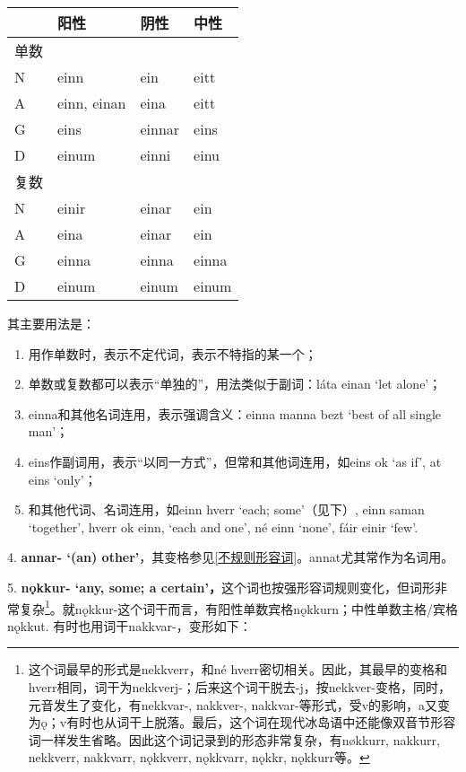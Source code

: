 \begin{longtable}{llll}
  \toprule
     & 阳性          & 阴性     & 中性    \\
  \midrule
  \endhead
  \bottomrule
  \endfoot
  单数 &             &        &       \\
  N  & einn        & ein    & eitt  \\
  A  & einn, einan & eina   & eitt  \\
  G  & eins        & einnar & eins  \\
  D  & einum       & einni  & einu  \\
  复数 &             &        &       \\
  N  & einir       & einar  & ein   \\
  A  & eina        & einar  & ein   \\
  G  & einna       & einna  & einna \\
  D  & einum       & einum  & einum \\
\end{longtable}

其主要用法是：

\begin{enumerate}
  \def\labelenumi{\Alph{enumi}.}
  \item
        用作单数时，表示不定代词，表示不特指的某一个；
  \item
        单数或复数都可以表示``单独的''，用法类似于副词：láta einan `let
        alone'；
  \item
        einna和其他名词连用，表示强调含义：einna manna bezt `best of all
        single man'；
  \item
        eins作副词用，表示``以同一方式''，但常和其他词连用，如eins ok `as if',
        at eins `only'；
  \item
        和其他代词、名词连用，如einn hverr `each; some‌'（见下）, einn saman
        `together', hverr ok einn, `each and one', né einn `none', fáir einir
        `few'.
\end{enumerate}

4. \textbf{annar- `(an)
  other‌'}，其变格参见\ref{不规则形容词}。annat尤其常作为名词用。

5. \textbf{nǫkkur- `any, some; a
  certain‌'，}这个词也按强形容词规则变化，但词形非常复杂\footnote{这个词最早的形式是nekkverr，和né
  hverr密切相关。因此，其最早的变格和hverr相同，词干为nekkverj-；后来这个词干脱去-j，按nekkver-变格，同时，元音发生了变化，有nekkvar-,
  nakkver-,
  nakkvar-等形式，受v的影响，a又变为ǫ；v有时也从词干上脱落。最后，这个词在现代冰岛语中还能像双音节形容词一样发生省略。因此这个词记录到的形态非常复杂，有nøkkurr,
  nakkurr, nekkverr, nakkvarr, nǫkkverr, nǫkkvarr, nǫkkr, nǫkkurr等。}。就nǫkkur-这个词干而言，有阳性单数宾格nǫkkurn；中性单数主格/宾格nǫkkut.
有时也用词干nakkvar-，变形如下：


